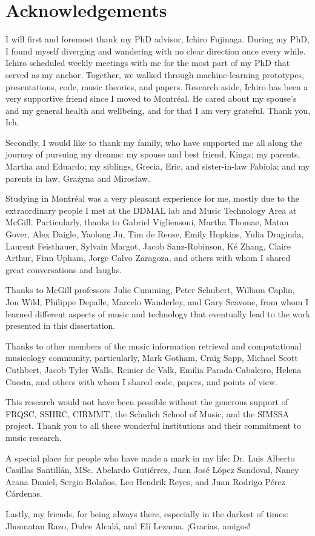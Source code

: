 \chapter*{Acknowledgements}
\label{chap:chap0-ack}

I will first and foremost thank my PhD advisor, Ichiro Fujinaga.
During my PhD, I found myself diverging and wandering with no clear direction once every while.
Ichiro scheduled weekly meetings with me for the most part of my PhD that served as my anchor. 
Together, we walked through machine-learning prototypes, presentations, code, music theories, and papers. 
Research aside, Ichiro has been a very supportive friend since I moved to Montr\'eal. 
He cared about my spouse's and my general health and wellbeing, and for that I am very grateful. 
Thank you, Ich.

Secondly, I would like to thank my family, who have supported me all along the journey of pursuing my dreams: my spouse and best friend, Kinga; my parents, Martha and Eduardo; my siblings, Grecia, Eric, and sister-in-law Fabiola; and my parents in law, Gra\.zyna and Miros\l{}aw.

Studying in Montr\'eal was a very pleasant experience for me, mostly due to the extraordinary people I met at the DDMAL lab and Music Technology Area at McGill.
Particularly, thanks to Gabriel Vigliensoni, Martha Thomae, Matan Gover, Alex Daigle, Yaolong Ju, Tim de Reuse, Emily Hopkins, Yulia Draginda, Laurent Feisthauer, Sylvain Margot, Jacob Sanz-Robinson, K\'e Zhang, Claire Arthur, Finn Upham, Jorge Calvo Zaragoza, and others with whom I shared great conversations and laughs.

Thanks to McGill professors Julie Cumming, Peter Schubert, William Caplin, Jon Wild, Philippe Depalle, Marcelo Wanderley, and Gary Scavone, from whom I learned different aspects of music and technology that eventually lead to the work presented in this dissertation.

Thanks to other members of the music information retrieval and computational musicology community, particularly, Mark Gotham, Craig Sapp, Michael Scott Cuthbert, Jacob Tyler Walls, Reinier de Valk, Emilia Parada-Cabaleiro, Helena Cuesta, and others with whom I shared code, papers, and points of view. 

This research would not have been possible without the generous support of FRQSC, SSHRC, CIRMMT, the Schulich School of Music, and the SIMSSA project. Thank you to all these wonderful institutions and their commitment to music research.

A special place for people who have made a mark in my life: Dr. Luis Alberto Casillas Santill\'an, MSc. Abelardo Guti\'errez, Juan Jos\'e L\'opez Sandoval, Nancy Arana Daniel, Sergio Bola\~nos, Leo Hendrik Reyes, and Juan Rodrigo P\'erez C\'ardenas.

Lastly, my friends, for being always there, especially in the darkest of times: Jhonnatan Razo, Dulce Alcal\'a, and El\'i Lezama. ¡Gracias, amigos!
